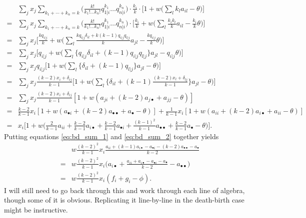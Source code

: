 \documentclass[14pt, justified]{tufte-handout}
\begin{document}
\begin{equation}
    \begin{split}
        & \sum_j x_j \sum_{k_1 + \cdots + k_n = k} \Big( \frac{k!}{k_1! \ldots k_n!} q_{1|i}^{k_1} \ldots q_{n|i}^{k_n} \Big) \cdot \frac{k_i}{k} \cdot \Big[ 1 + w \Big( \sum_l k_l a_{il} - \theta \Big) \Big]
        \\
        = & \sum_j x_j \sum_{k_1 + \cdots + k_n = k} \Big( \frac{k!}{k_1! \ldots k_n!} q_{1|i}^{k_1} \ldots q_{n|i}^{k_n} \Big) \cdot \Big[ \frac{k_i}{k} + w \Big( \sum_l \frac{k_i k_l}{k} a_{il} - \frac{k_i}{k}\theta \Big) \Big]
        \\
        = & \sum_j x_j \Big[ \frac{kq_{i|j}}{k} + w \Big( \sum_l \frac{k q_{i|j} \delta_{il} + k(k-1) q_{i|j} q_{l|j}}{k}a_{jl} - \frac{kq_{i|j}}{k}\theta \Big) \Big]
        \\
        = & \sum_j x_j \Big[ q_{i|j} + w \Big( \sum_l \{ q_{i|j} \delta_{il} + (k-1) q_{i|j} q_{l|j} \} a_{jl} - q_{i|j} \theta \Big) \Big]
        \\
        = & \sum_j x_j q_{i|j} \Big[ 1 + w \Big( \sum_l \{ \delta_{il} + (k-1) q_{l|j} \} a_{jl} - \theta \Big) \Big]
        \\
        = & \sum_j x_j \frac{(k-2)x_i + \delta_{ij}}{k-1} \Big[ 1 + w \Big( \sum_l \Big\{ \delta_{il} + (k-1) \frac{(k-2)x_l +\delta_{lj}}{k-1} \Big\} a_{jl} - \theta \Big) \Big]
        \\
        = & \sum_j x_j \frac{(k-2)x_i + \delta_{ij}}{k-1} [ 1 + w(a_{ji} + (k-2) a_{j \bullet} + a_{jj} - \theta )]
        \\
        = & \frac{k-2}{k-1} x_i [ 1 + w(a_{\bullet i} + (k-2) a_{\bullet \bullet} + a_{\bullet} - \theta )]
        + \frac{1}{k-1} x_i [ 1 + w(a_{ii} + (k-2) a_{i \bullet} + a_{ii} - \theta )]
        \\
        = & x_i \Big[ 1 + w \Big( \frac{2}{k-1} a_{ii} + \frac{k-2}{k-1} a_{i \bullet} + \frac{k-2}{k-1} a_{\bullet i} + \frac{(k-1)^2}{k-1} a_{\bullet \bullet} + \frac{k-2}{k-1} a_{\bullet} - \theta \Big) \Big].
    \end{split}
    \label{eq:bd_sum_2}
\end{equation}
Putting equations \ref{eq:bd_sum_1} and \ref{eq:bd_sum_2} together yields
\begin{equation}
    \begin{split}
        & w \frac{(k-2)^2}{k-1} x_i \frac{a_{ii} + (k-1) a_{i \bullet} - a_{\bullet i} - (k-2) a_{\bullet \bullet} - a_{\bullet}}{k-2}
        \\
        = & w \frac{(k-2)^2}{k-1} x_i \Big( a_{i \bullet} + \frac{a_{ii} + a_{i \bullet} - a_{\bullet i} - a_{\bullet}}{k-2} - a_{\bullet \bullet} \Big)
        \\
        = & w \frac{(k-2)^2}{k-1} x_i (f_i + g_i - \phi).
    \end{split}
\end{equation}
I will still need to go back through this and work through each line of algebra, though some of it is obvious.
Replicating it line-by-line in the death-birth case might be instructive.
\end{document}
